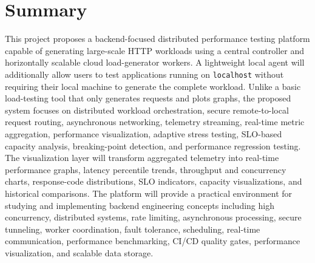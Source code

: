 \documentclass[11pt,a4paper]{article}
\begin{document}
\section{Summary} This project proposes a backend-focused distributed performance testing platform capable of generating large-scale HTTP workloads using a central controller and horizontally scalable cloud load-generator workers. A lightweight local agent will additionally allow users to test applications running on \texttt{localhost} without requiring their local machine to generate the complete workload. Unlike a basic load-testing tool that only generates requests and plots graphs, the proposed system focuses on distributed workload orchestration, secure remote-to-local request routing, asynchronous networking, telemetry streaming, real-time metric aggregation, performance visualization, adaptive stress testing, SLO-based capacity analysis, breaking-point detection, and performance regression testing. The visualization layer will transform aggregated telemetry into real-time performance graphs, latency percentile trends, throughput and concurrency charts, response-code distributions, SLO indicators, capacity visualizations, and historical comparisons. The platform will provide a practical environment for studying and implementing backend engineering concepts including high concurrency, distributed systems, rate limiting, asynchronous processing, secure tunneling, worker coordination, fault tolerance, scheduling, real-time communication, performance benchmarking, CI/CD quality gates, performance visualization, and scalable data storage.

\end{document}
